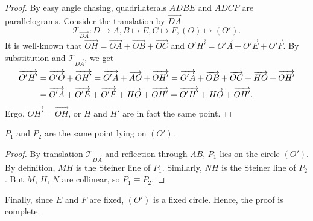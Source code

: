 \documentclass[11pt]{article}
\begin{document}
\begin{solution}
\begin{enumerate}
                \begin{proof}
                    By easy angle chasing, quadrilaterals \(ADBE\) and \(ADCF\) are parallelograms. Consider the translation by \(\overrightarrow{DA}\)
                    \[\mathcal{T}_{\overrightarrow{DA}}: D \mapsto A, B \mapsto E, C \mapsto F, (O) \mapsto (O').\]
                    It is well-known that \(\overrightarrow{OH} = \overrightarrow{OA} + \overrightarrow{OB} + \overrightarrow{OC}\) and \(\overrightarrow{O'H'} = \overrightarrow{O'A} + \overrightarrow{O'E} + \overrightarrow{O'F}\). By substitution and \(\mathcal{T}_{\overrightarrow{DA}}\), we get
                    \begin{equation}
                        \begin{aligned}
                            \overrightarrow{O'H'} 
                            &= \overrightarrow{O'O} + \overrightarrow{OH'} = \overrightarrow{O'A} + \overrightarrow{AO} + \overrightarrow{OH'} = \overrightarrow{O'A} + \overrightarrow{OB} + \overrightarrow{OC} + \overrightarrow{HO} + \overrightarrow{OH'} \\
                            &= \overrightarrow{O'A} + \overrightarrow{O'E} + \overrightarrow{O'F} + \overrightarrow{HO} + \overrightarrow{OH'} = \overrightarrow{O'H'} + \overrightarrow{HO} + \overrightarrow{OH'}.
                        \end{aligned}
                        \notag
                    \end{equation}
                    Ergo, \(\overrightarrow{OH'} = \overrightarrow{OH}\), or \(H\) and \(H'\) are in fact the same point.
                \end{proof}

                \begin{claim}
                    \(P_1\) and \(P_2\) are the same point lying on \((O')\).
                \end{claim}

                \begin{proof}
                    By translation \(\mathcal{T}_{\overrightarrow{DA}}\) and reflection through \(AB\), \(P_1\) lies on the circle \((O')\). By definition, \(MH\) is the Steiner line of \(P_1\). Similarly, \(NH\) is the Steiner line of \(P_2\). But \(M\), \(H\), \(N\) are collinear, so \(P_1 \equiv P_2\).
                \end{proof}

                Finally, since \(E\) and \(F\) are fixed, \((O')\) is a fixed circle. Hence, the proof is complete.
            \end{enumerate}
        \end{solution}
\end{document}
